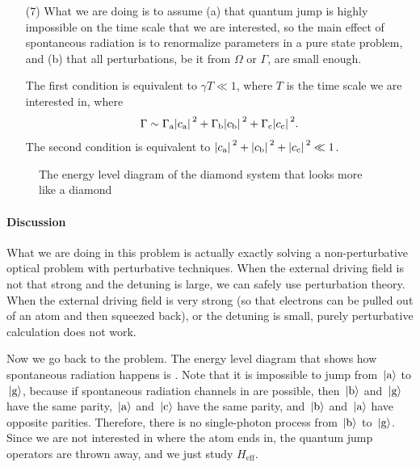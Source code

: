 \documentclass[hyperref, a4paper]{article}
\begin{document}
\begin{itemize}
\item[(7)] What we are doing is to assume (a) that quantum jump is highly impossible on the time scale that we 
are interested, so the main effect of spontaneous radiation is to renormalize parameters in a pure state problem,
and (b) that all perturbations, be it from $\Omega$ or $\Gamma$, are small enough. 

The first condition is equivalent to $\gamma T \ll 1$, where $T$ is the time scale we are interested in, where 
\begin{equation}
    \Gamma \sim \Gamma_\text{a} \abs*{c_\text{a}}^2 + \Gamma_\text{b} \abs*{c_\text{b}}^2 + \Gamma_\text{c} \abs*{c_\text{c}}^2.
\end{equation}
The second condition is equivalent to $\abs*{c_\text{a}}^2 + \abs*{c_\text{b}}^2 + \abs*{c_\text{c}}^2 \ll 1$. 

\end{itemize}

\begin{figure}
    \centering
    
    \caption{The energy level diagram of the diamond system that looks more like a diamond}
    \label{fig:diamond}
\end{figure}

\paragraph{Discussion} What we are doing in this problem is actually exactly solving a non-perturbative 
optical problem with perturbative techniques. When the external driving field is not that strong and the 
detuning is large, we can safely use perturbation theory. When the external driving field is very strong 
(so that electrons can be pulled out of an atom and then squeezed back), or the detuning is small, 
purely perturbative calculation does not work. 

Now we go back to the problem. The energy level diagram that shows how spontaneous radiation happens is 
. Note that it is impossible to jump from $\ket*{\text{a}}$ to $\ket*{\text{g}}$,
because if spontaneous radiation channels in  are possible, then $\ket*{\text{b}}$
and $\ket*{\text{g}}$ have the same parity, $\ket*{\text{a}}$ and $\ket*{\text{c}}$ have the same parity, 
and $\ket*{\text{b}}$ and $\ket*{\text{a}}$ have opposite parities. 
Therefore, there is no single-photon process from $\ket*{\text{b}}$ to $\ket*{\text{g}}$.
Since we are not interested in where the atom ends in, the quantum jump operators are thrown away,
and we just study $H_\text{eff}$.
\end{document}
